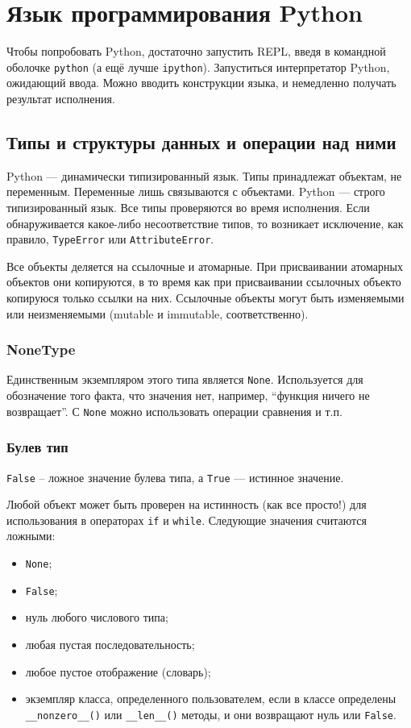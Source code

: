 \chapter{Язык программирования Python}
\label{ch:python}

Чтобы попробовать Python, достаточно запустить REPL, введя в командной оболочке \texttt{python} (а ещё лучше \texttt{ipython}). Запуститься интерпретатор Python, ожидающий ввода. Можно вводить конструкции языка, и немедленно получать результат исполнения.

\section{Типы и структуры данных и операции над ними}
\label{sec:py-types}
Python --- динамически типизированный язык. Типы принадлежат объектам, не переменным. Переменные лишь связываются с объектами. Python --- строго типизированный язык. Все типы проверяются во время исполнения. Если обнаруживается какое-либо несоответствие типов, то возникает исключение, как правило, \lstinline{TypeError} или \lstinline{AttributeError}.

Все объекты деляется на ссылочные и атомарные. При присваивании атомарных объектов они копируются, в то время как при присваивании ссылочных объекто копируюся только ссылки на них. Ссылочные объекты могут быть изменяемыми или неизменяемыми (mutable и immutable, соответственно).

\subsection{NoneType}
Единственным экземпляром этого типа является \lstinline{None}. Используется для обозначение того факта, что значения нет, например, ``функция ничего не возвращает''. С \lstinline{None} можно использовать операции сравнения и т.п.

\subsection{Булев тип}
\lstinline{False} -- ложное значение булева типа, а \lstinline{True} --- истинное значение.

Любой объект может быть проверен на истинность (как все просто!) для использования в операторах \lstinline{if} и \lstinline{while}. Следующие значения считаются ложными:
\begin{itemize}
  \item \lstinline{None};
  \item \lstinline{False};
  \item нуль любого числового типа;
  \item любая пустая последовательность;
  \item любое пустое отображение (словарь);
  \item экземпляр класса, определенного пользователем, если в классе определены \lstinline{__nonzero__()} или \lstinline{__len__()} методы, и они возвращают нуль или \lstinline{False}.
\end{itemize}

